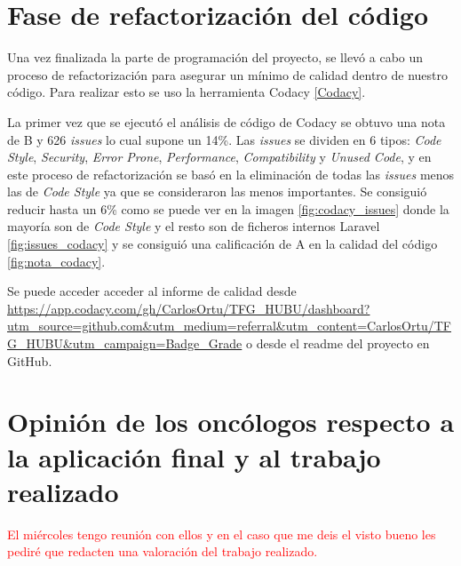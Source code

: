 
\section{Fase de refactorización del código}

Una vez finalizada la parte de programación del proyecto, se llevó a cabo un proceso de refactorización para asegurar un mínimo de calidad dentro de nuestro código. Para realizar esto se uso la herramienta Codacy \ref{Codacy}.

La primer vez que se ejecutó el análisis de código de Codacy se obtuvo una nota de B y 626 \textit{issues} lo cual supone un 14\%. Las \textit{issues} se dividen en 6 tipos: \textit{Code Style},  \textit{Security}, \textit{Error Prone}, \textit{Performance}, \textit{Compatibility} y \textit{Unused Code}, y en este proceso de refactorización se basó en la eliminación de todas las \textit{issues} menos las de \textit{Code Style} ya que se consideraron las menos importantes. Se consiguió reducir hasta un 6\% como se puede ver en la imagen \ref{fig:codacy_issues} donde la mayoría son de \textit{Code Style} y el resto son de ficheros internos Laravel \ref{fig:issues_codacy} y se consiguió una calificación de A en la calidad del código \ref{fig:nota_codacy}.




Se puede acceder acceder al informe de calidad desde \url{https://app.codacy.com/gh/CarlosOrtu/TFG_HUBU/dashboard?utm_source=github.com&utm_medium=referral&utm_content=CarlosOrtu/TFG_HUBU&utm_campaign=Badge_Grade} o desde el readme del proyecto en GitHub.

\section{Opinión de los oncólogos respecto a la aplicación final y al trabajo realizado}

\textcolor{red}{El miércoles tengo reunión con ellos y en el caso que me deis el visto bueno les pediré que redacten una valoración del trabajo realizado.}

